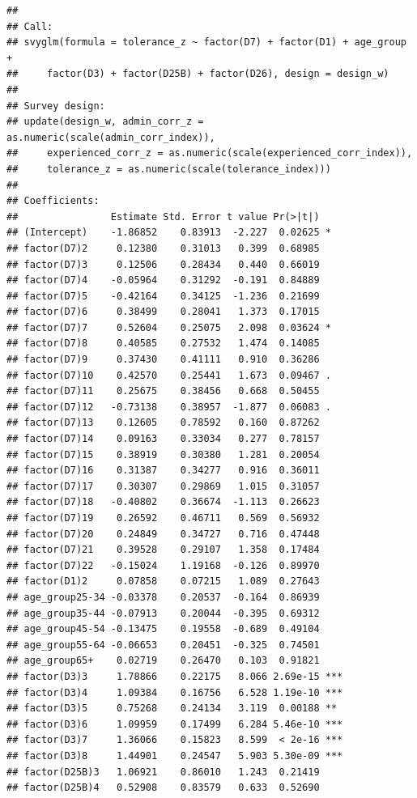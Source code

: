 \documentclass[
]{article}
\begin{document}
\begin{verbatim}
## 
## Call:
## svyglm(formula = tolerance_z ~ factor(D7) + factor(D1) + age_group + 
##     factor(D3) + factor(D25B) + factor(D26), design = design_w)
## 
## Survey design:
## update(design_w, admin_corr_z = as.numeric(scale(admin_corr_index)), 
##     experienced_corr_z = as.numeric(scale(experienced_corr_index)), 
##     tolerance_z = as.numeric(scale(tolerance_index)))
## 
## Coefficients:
##                Estimate Std. Error t value Pr(>|t|)    
## (Intercept)    -1.86852    0.83913  -2.227  0.02625 *  
## factor(D7)2     0.12380    0.31013   0.399  0.68985    
## factor(D7)3     0.12506    0.28434   0.440  0.66019    
## factor(D7)4    -0.05964    0.31292  -0.191  0.84889    
## factor(D7)5    -0.42164    0.34125  -1.236  0.21699    
## factor(D7)6     0.38499    0.28041   1.373  0.17015    
## factor(D7)7     0.52604    0.25075   2.098  0.03624 *  
## factor(D7)8     0.40585    0.27532   1.474  0.14085    
## factor(D7)9     0.37430    0.41111   0.910  0.36286    
## factor(D7)10    0.42570    0.25441   1.673  0.09467 .  
## factor(D7)11    0.25675    0.38456   0.668  0.50455    
## factor(D7)12   -0.73138    0.38957  -1.877  0.06083 .  
## factor(D7)13    0.12605    0.78592   0.160  0.87262    
## factor(D7)14    0.09163    0.33034   0.277  0.78157    
## factor(D7)15    0.38919    0.30380   1.281  0.20054    
## factor(D7)16    0.31387    0.34277   0.916  0.36011    
## factor(D7)17    0.30307    0.29869   1.015  0.31057    
## factor(D7)18   -0.40802    0.36674  -1.113  0.26623    
## factor(D7)19    0.26592    0.46711   0.569  0.56932    
## factor(D7)20    0.24849    0.34727   0.716  0.47448    
## factor(D7)21    0.39528    0.29107   1.358  0.17484    
## factor(D7)22   -0.15024    1.19168  -0.126  0.89970    
## factor(D1)2     0.07858    0.07215   1.089  0.27643    
## age_group25-34 -0.03378    0.20537  -0.164  0.86939    
## age_group35-44 -0.07913    0.20044  -0.395  0.69312    
## age_group45-54 -0.13475    0.19558  -0.689  0.49104    
## age_group55-64 -0.06653    0.20451  -0.325  0.74501    
## age_group65+    0.02719    0.26470   0.103  0.91821    
## factor(D3)3     1.78866    0.22175   8.066 2.69e-15 ***
## factor(D3)4     1.09384    0.16756   6.528 1.19e-10 ***
## factor(D3)5     0.75268    0.24134   3.119  0.00188 ** 
## factor(D3)6     1.09959    0.17499   6.284 5.46e-10 ***
## factor(D3)7     1.36066    0.15823   8.599  < 2e-16 ***
## factor(D3)8     1.44901    0.24547   5.903 5.30e-09 ***
## factor(D25B)3   1.06921    0.86010   1.243  0.21419    
## factor(D25B)4   0.52908    0.83579   0.633  0.52690    

\end{verbatim}
\end{document}
